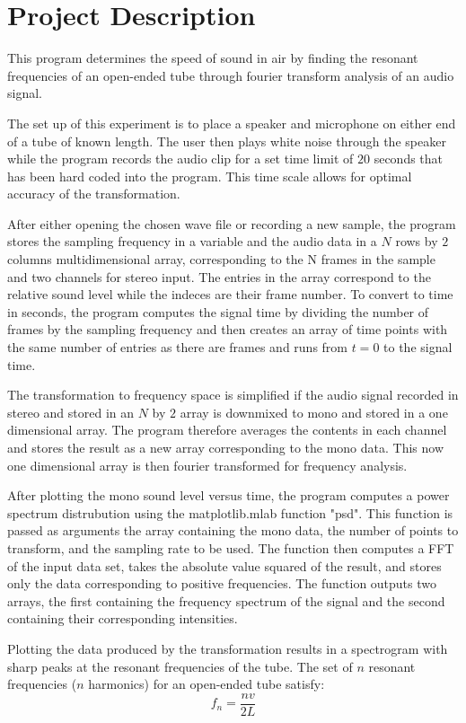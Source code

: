 \documentclass[12pt]{article}
\begin{document}
\section{Project Description}
This program determines the speed of sound in air by finding the resonant
frequencies of an open-ended tube through fourier transform analysis of an
audio signal.

The set up of this experiment is to place a speaker and microphone on either
end of a tube of known length. The user then plays white noise through
the speaker while the program records the audio clip for a set time limit of
$20$ seconds that has been hard coded into the program. This time scale allows
for optimal accuracy of the transformation.

After either opening the chosen wave file or recording a new sample, the program
stores the sampling frequency in a variable and the audio data in
a $N$ rows by $2$ columns multidimensional array, corresponding to the N frames
in the sample and two channels for stereo input. The entries in the array
correspond to the relative sound level while the indeces are their
frame number. To convert to time in seconds,
the program computes the signal time by dividing the number of frames by the
sampling frequency and then creates an array of time points with the same
number of entries as there are frames and runs from $t=0$ to the signal time.

The transformation to frequency space is simplified if the audio signal
recorded in stereo and stored in an $N$ by $2$ array is downmixed to mono and
stored in a one dimensional array. The program therefore averages the contents
in each channel and stores the result as a new array corresponding to the mono
data. This now one dimensional array is then fourier transformed for frequency
analysis.

After plotting the mono sound level versus time, the program computes a
power spectrum distrubution using the matplotlib.mlab function "psd". This
function is passed as arguments the array containing the mono data, the number
of points to transform, and the sampling rate to be used. The function then
computes a FFT of the input data set, takes the absolute value 
squared of the result, and stores only the data corresponding to positive
frequencies. The function outputs two arrays, the first containing the frequency
spectrum of the signal and the second containing their corresponding
intensities.

Plotting the data produced by the transformation results in a spectrogram with
sharp peaks at the resonant frequencies of the tube. The set of $n$ resonant
frequencies ($n$ harmonics) for an open-ended tube satisfy:
\begin{equation} \label{eq:1}
f_n = \frac{nv}{2L}
\end{equation}
\end{document}
